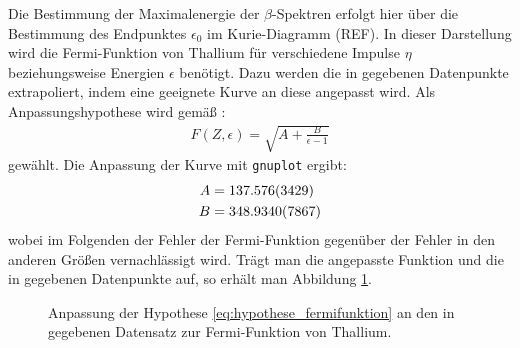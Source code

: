 \documentclass[11pt, a4paper]{article}
\numberwithin{equation}{section}
\begin{document}
Die Bestimmung der Maximalenergie der $\beta$-Spektren erfolgt hier über die Bestimmung des Endpunktes $\epsilon_0$ im Kurie-Diagramm (REF).
In dieser Darstellung wird die Fermi-Funktion von Thallium für verschiedene Impulse $\eta$ beziehungsweise Energien $\epsilon$ benötigt.
Dazu werden die in \cite{anleitung} gegebenen Datenpunkte extrapoliert, indem eine geeignete Kurve an diese angepasst wird.
Als Anpassungshypothese wird gemäß \cite{fermi_function}:
\begin{align}
	F(Z, \epsilon) = \sqrt{A + \frac{B}{\epsilon - 1}}
	\label{eq:hypothese_fermifunktion}
\end{align}
gewählt.
Die Anpassung der Kurve mit \texttt{gnuplot} ergibt:
\begin{align*}
	A &= \num{137.576 +- 3.429} \\
	B &= \num{348.934 +- 0.7867}
\end{align*}
wobei im Folgenden der Fehler der Fermi-Funktion gegenüber der Fehler in den anderen Größen vernachlässigt wird.
Trägt man die angepasste Funktion und die in \cite{anleitung} gegebenen Datenpunkte auf, so erhält man Abbildung \ref{fig:fermi_tl}.
\begin{figure}[h]
	\centering
	
	\caption{Anpassung der Hypothese \eqref{eq:hypothese_fermifunktion} an den in \cite{anleitung} gegebenen Datensatz zur Fermi-Funktion von Thallium.}
	\label{fig:fermi_tl}
\end{figure}
\end{document}
